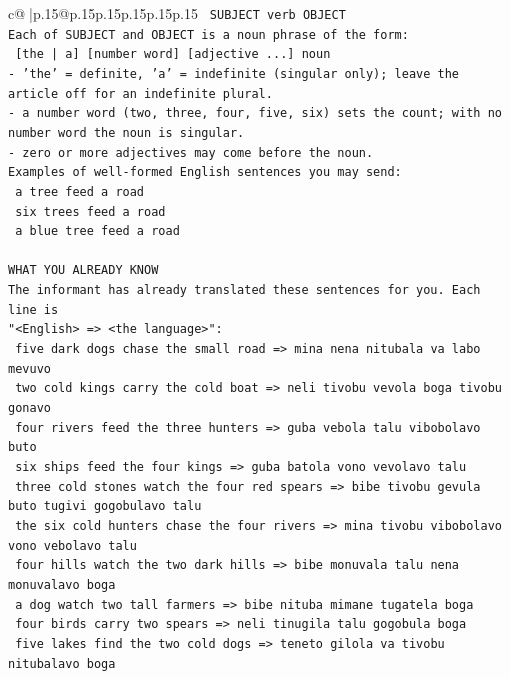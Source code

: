 \documentclass{article}
\begin{document}
{\begin{supertabular}{c@{$\;$}|p{.15\linewidth}@{}p{.15\linewidth}p{.15\linewidth}p{.15\linewidth}p{.15\linewidth}p{.15\linewidth}}
{{{\texttt{    SUBJECT  verb  OBJECT} \\
\texttt{Each of SUBJECT and OBJECT is a noun phrase of the form:} \\
\texttt{    {[}the | a{]}  {[}number word{]}  {[}adjective ...{]}  noun} \\
\texttt{{-} 'the' = definite, 'a' = indefinite (singular only); leave the article off for an indefinite plural.} \\
\texttt{{-} a number word (two, three, four, five, six) sets the count; with no number word the noun is singular.} \\
\texttt{{-} zero or more adjectives may come before the noun.} \\
\texttt{Examples of well{-}formed English sentences you may send:} \\
\texttt{    a tree feed a road} \\
\texttt{    six trees feed a road} \\
\texttt{    a blue tree feed a road} \\
\\ 
\texttt{WHAT YOU ALREADY KNOW} \\
\texttt{The informant has already translated these sentences for you. Each line is} \\
\texttt{"<English>  =>  <the language>":} \\
\texttt{    five dark dogs chase the small road  =>  mina nena nitubala va labo mevuvo} \\
\texttt{    two cold kings carry the cold boat  =>  neli tivobu vevola boga tivobu gonavo} \\
\texttt{    four rivers feed the three hunters  =>  guba vebola talu vibobolavo buto} \\
\texttt{    six ships feed the four kings  =>  guba batola vono vevolavo talu} \\
\texttt{    three cold stones watch the four red spears  =>  bibe tivobu gevula buto tugivi gogobulavo talu} \\
\texttt{    the six cold hunters chase the four rivers  =>  mina tivobu vibobolavo vono vebolavo talu} \\
\texttt{    four hills watch the two dark hills  =>  bibe monuvala talu nena monuvalavo boga} \\
\texttt{    a dog watch two tall farmers  =>  bibe nituba mimane tugatela boga} \\
\texttt{    four birds carry two spears  =>  neli tinugila talu gogobula boga} \\
\texttt{    five lakes find the two cold dogs  =>  teneto gilola va tivobu nitubalavo boga} \\
}}}
\end{supertabular}}
\end{document}
